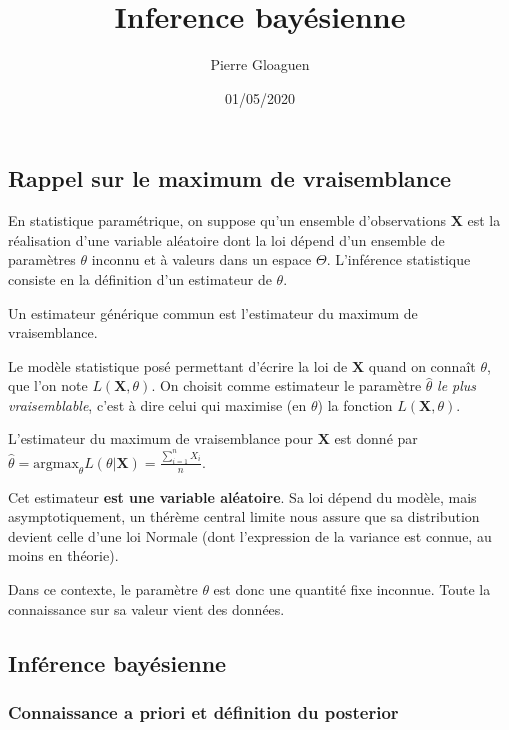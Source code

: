 \documentclass[]{article}
\title{Inference bayésienne}
\author{Pierre Gloaguen}
\date{01/05/2020}
\begin{document}
\maketitle

\hypertarget{rappel-sur-le-maximum-de-vraisemblance}{%
\subsection{Rappel sur le maximum de
vraisemblance}\label{rappel-sur-le-maximum-de-vraisemblance}}

En statistique paramétrique, on suppose qu'un ensemble d'observations
\(\mathbf{X}\) est la réalisation d'une variable aléatoire dont la loi
dépend d'un ensemble de paramètres \(\theta\) inconnu et à valeurs dans
un espace \(\Theta\). L'inférence statistique consiste en la définition
d'un estimateur de \(\theta\).

Un estimateur générique commun est l'estimateur du maximum de
vraisemblance.

Le modèle statistique posé permettant d'écrire la loi de \(\mathbf{X}\)
quand on connaît \(\theta\), que l'on note \(L(\mathbf{X}, \theta)\). On
choisit comme estimateur le paramètre \(\hat{\theta}\)
\textit{le plus vraisemblable}, c'est à dire celui qui maximise (en
\(\theta\)) la fonction \(L(\mathbf{X}, \theta)\).

L'estimateur du maximum de vraisemblance pour \(\mathbf{X}\) est donné
par
\(\hat{\theta} = \text{argmax}_{\theta}L(\theta\vert \mathbf{X}) = \frac{\sum_{i=1}^n X_i}{n}\).

Cet estimateur \textbf{est une variable aléatoire}. Sa loi dépend du
modèle, mais asymptotiquement, un thérème central limite nous assure que
sa distribution devient celle d'une loi Normale (dont l'expression de la
variance est connue, au moins en théorie).

Dans ce contexte, le paramètre \(\theta\) est donc une quantité fixe
inconnue. Toute la connaissance sur sa valeur vient des données.

\hypertarget{infuxe9rence-bayuxe9sienne}{%
\subsection{Inférence bayésienne}\label{infuxe9rence-bayuxe9sienne}}

\hypertarget{connaissance-a-priori-et-duxe9finition-du-posterior}{%
\subsubsection{Connaissance a priori et définition du
posterior}\label{connaissance-a-priori-et-duxe9finition-du-posterior}}
\end{document}
